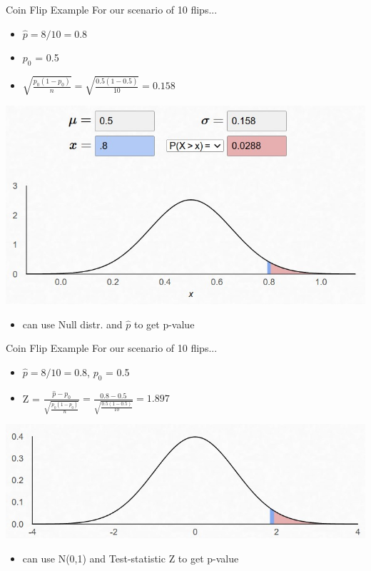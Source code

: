 \documentclass{beamer}
\begin{document}
\begin{frame}{Coin Flip Example}
For our scenario of 10 flips...
\begin{itemize}
    \item $\hat{p} = 8 / 10 = 0.8$
    \item $p_0$ = 0.5
    \item $\sqrt{\frac{p_0(1 - p_0)}{n}} = \sqrt{\frac{0.5(1 - 0.5)}{10}} = 0.158$
\end{itemize}
\begin{center}
    \includegraphics[scale=.65]{img/coin_null_distr3.jpg}
\end{center}
\begin{itemize}
    \item can use Null distr. and $\hat{p}$ to get p-value
\end{itemize}

\end{frame}

\begin{frame}{Coin Flip Example}
For our scenario of 10 flips...
\begin{itemize}
    \item $\hat{p} = 8 / 10 = 0.8$, $p_0$ = 0.5
    \item Z = $\frac{\widehat{p}-p_0}{\sqrt{\frac{p_0(1 - p_0)}{n}}} = \frac{0.8-0.5}{\sqrt{\frac{0.5(1 - 0.5)}{10}}} = 1.897$
\end{itemize}
\begin{center}
    \includegraphics[scale=.75]{img/coin_null_distr4.jpg}
\end{center}
\begin{itemize}
    \item can use N(0,1) and Test-statistic Z to get p-value
\end{itemize}
\end{frame}
\end{document}
